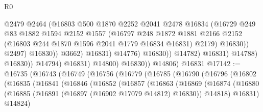 \begin{lexlean}{R0}
\begin{coremodule}
                                          @2479
                                          @2464
                                          (@16803
                                            @500
                                            @1870
                                            @2252
                                            @2041
                                            @2478
                                            @16834
                                            (@16729
                                              @249
                                              @83
                                              @1882
                                              @1594
                                              @2152
                                              @1557
                                              (@16797
                                                @248
                                                @1872
                                                @1881
                                                @2166
                                                @2152
                                                (@16803 @244 @1870 @1596 @2041 @1779 @16834 @16831)
                                                @2179)
                                              @16830))
                                          @2497)
                                        @16830))
                                    @3662)
                                  @16831)
                                @14776)
                              @16830))
                          @14782)
                        @16831)
                      @14788)
                    @16830))
                @14794)
              @16831)
            @14800)
          @16830))
      @14806)
    @16831
@17142 := @16735
    (@16743
      (@16749
        (@16756
          (@16779
            (@16785
              (@16790
                (@16796
                  (@16802
                    (@16835
                      (@16841
                        (@16846
                          (@16852
                            (@16857
                              (@16863
                                (@16869
                                  (@16874
                                    (@16880
                                      (@16885
                                        (@16891 (@16897 (@16902 @17079 @14812) @16830))
                                        @14818)
                                      @16831)
                                    @14824)

\end{coremodule}
\end{lexlean}

